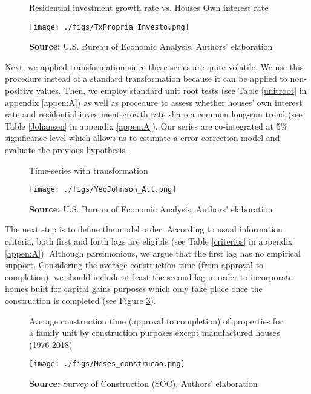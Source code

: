 \documentclass[12pt, a4]{article}
\begin{document}
\begin{figure}[htb]
	\centering
	\caption{Residential investment growth rate vs. Houses Own interest rate}
	\label{propria_investo}
	\texttt{[image: ./figs/TxPropria\_Investo.png]}
	\caption*{\textbf{Source:} U.S. Bureau of Economic Analysis, Authors' elaboration}
\end{figure}


Next, we applied \textcite{yeo_new_2000} transformation since these series are quite volatile. We use this procedure instead of a standard \textcite{box_analysis_1964} transformation  because it can be applied to non-positive values. 
Then, we employ standard unit root tests (see Table \ref{unitroot} in appendix \ref{appen:A}) as well as \textcite{johansen_estimation_1991} procedure to assess whether houses' own interest rate and residential investment growth rate share a common long-run trend (see Table \ref{Johansen} in appendix \ref{appen:A}).
Our series are co-integrated at 5\% significance level which allows us to estimate a error correction model and evaluate the previous hypothesis \cite{enders_applied_2014}.

\begin{figure}[htb]
	\centering
	\caption{Time-series with \textcite{yeo_new_2000} transformation}
	\label{YeoJhonson}
	\texttt{[image: ./figs/YeoJohnson\_All.png]}
	\caption*{\textbf{Source:} U.S. Bureau of Economic Analysis, Authors' elaboration}
\end{figure}




The next step is to define the model order. According to usual information criteria, both first and forth lags are eligible (see Table \ref{criterios} in appendix \ref{appen:A}).
Although parsimonious, we argue that the first lag has no empirical support.
Considering the average construction time (from approval to completion), we should include at least the second lag in order to incorporate homes built for capital gains purposes which only take place once the construction is completed (see Figure \ref{meses}).

\begin{figure}[H]
	\centering
	\caption{Average construction time (approval to completion) of properties for a family unit by construction purposes except manufactured houses (1976-2018)}
    \label{meses}
	\texttt{[image: ./figs/Meses\_construcao.png]}
	\caption*{\textbf{Source:} Survey of Construction (SOC), Authors' elaboration}
\end{figure}
\end{document}
